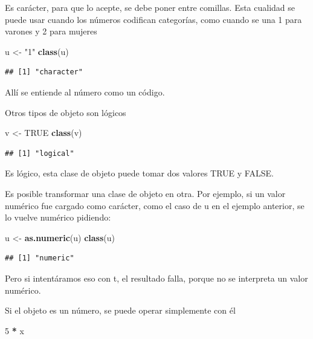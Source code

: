 \documentclass[]{book}
\newenvironment{Shaded}{\begin{snugshade}}{\end{snugshade}}
\newcommand{\DecValTok}[1]{\textcolor[rgb]{0.00,0.00,0.81}{#1}}
\newcommand{\KeywordTok}[1]{\textcolor[rgb]{0.13,0.29,0.53}{\textbf{#1}}}
\newcommand{\NormalTok}[1]{#1}
\newcommand{\OperatorTok}[1]{\textcolor[rgb]{0.81,0.36,0.00}{\textbf{#1}}}
\newcommand{\OtherTok}[1]{\textcolor[rgb]{0.56,0.35,0.01}{#1}}
\newcommand{\StringTok}[1]{\textcolor[rgb]{0.31,0.60,0.02}{#1}}
\begin{document}
Es carácter, para que lo acepte, se debe poner entre comillas. Esta cualidad se puede usar cuando los números codifican categorías, como cuando se una 1 para varones y 2 para mujeres

\begin{Shaded}
\begin{Highlighting}[]
\NormalTok{u <-}\StringTok{ "1"}
\KeywordTok{class}\NormalTok{(u)}
\end{Highlighting}
\end{Shaded}

\begin{verbatim}
## [1] "character"
\end{verbatim}

Allí se entiende al número como un código.

Otros tipos de objeto son lógicos

\begin{Shaded}
\begin{Highlighting}[]
\NormalTok{v <-}\StringTok{ }\OtherTok{TRUE}
\KeywordTok{class}\NormalTok{(v)}
\end{Highlighting}
\end{Shaded}

\begin{verbatim}
## [1] "logical"
\end{verbatim}

Es lógico, esta clase de objeto puede tomar dos valores TRUE y FALSE.

Es posible transformar una clase de objeto en otra. Por ejemplo, si un valor numérico fue cargado como carácter, como el caso de u en el ejemplo anterior, se lo vuelve numérico pidiendo:

\begin{Shaded}
\begin{Highlighting}[]
\NormalTok{u <-}\StringTok{ }\KeywordTok{as.numeric}\NormalTok{(u)}
\KeywordTok{class}\NormalTok{(u)}
\end{Highlighting}
\end{Shaded}

\begin{verbatim}
## [1] "numeric"
\end{verbatim}

Pero si intentáramos eso con t, el resultado falla, porque no se interpreta un valor numérico.

Si el objeto es un número, se puede operar simplemente con él

\begin{Shaded}
\begin{Highlighting}[]
\DecValTok{5} \OperatorTok{*}\StringTok{ }\NormalTok{x}
\end{Highlighting}
\end{Shaded}
\end{document}

